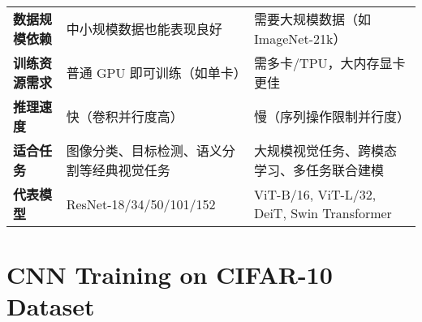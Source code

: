 \documentclass[UTF8]{report}
\theoremstyle{MyLineTheoremStyle} %
\theoremstyle{MyBlockTheoremStyle} %
\theoremstyle{MySubsubsectionStyle} %
\begin{document}
\begin{longtable}{@{}p{}p{}p{}@{}}
\textbf{数据规模依赖}       & 中小规模数据也能表现良好                       & 需要大规模数据（如 ImageNet-21k）           \\
\textbf{训练资源需求}       & 普通 GPU 即可训练（如单卡）                    & 需多卡/TPU，大内存显卡更佳                  \\
\textbf{推理速度}           & 快（卷积并行度高）                             & 慢（序列操作限制并行度）                     \\
\textbf{适合任务}           & 图像分类、目标检测、语义分割等经典视觉任务     & 大规模视觉任务、跨模态学习、多任务联合建模   \\
\textbf{代表模型}           & ResNet-18/34/50/101/152                        & ViT-B/16, ViT-L/32, DeiT, Swin Transformer    \\
\bottomrule
\end{longtable}



\cleardoublepage


\section{CNN Training on CIFAR-10 Dataset}  
\end{document}
